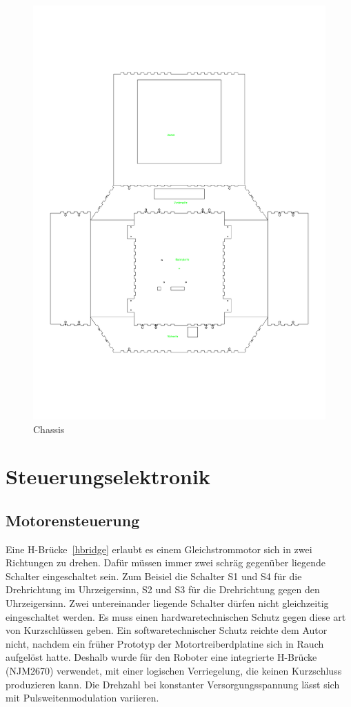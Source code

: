 \documentclass[a4paper,bibtotoc,oneside]{scrbook}
\begin{document}
\begin{figure}[htbp]
\centering
\includegraphics[width=125mm]{img/gehause.pdf}
\caption[Chassis]{Chassis}\label{chassis}
\end{figure}


\section{Steuerungselektronik}\thispagestyle{empty}
\subsection{Motorensteuerung}\thispagestyle{empty}


Eine H-Brücke~\ref{hbridge} erlaubt es einem Gleichstrommotor sich in zwei Richtungen zu drehen. Dafür müssen immer zwei schräg gegenüber liegende Schalter eingeschaltet sein. Zum Beisiel die Schalter S1 und S4 für die Drehrichtung im Uhrzeigersinn, S2 und S3 für die Drehrichtung gegen den Uhrzeigersinn. Zwei untereinander liegende Schalter dürfen nicht gleichzeitig eingeschaltet werden. Es muss einen hardwaretechnischen Schutz gegen diese art von Kurzschlüssen geben. Ein softwaretechnischer Schutz reichte dem Autor nicht, nachdem ein früher Prototyp der Motortreiberdplatine sich in Rauch aufgelöst hatte. Deshalb wurde für den Roboter eine integrierte H-Brücke (NJM2670) verwendet, mit einer logischen Verriegelung, die keinen Kurzschluss produzieren kann. 
\newline
Die Drehzahl bei konstanter Versorgungsspannung lässt sich mit Pulsweitenmodulation variieren.
\end{document}
